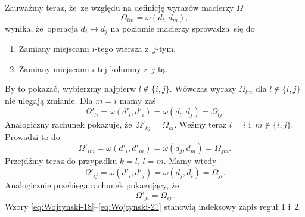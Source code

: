 \documentclass[a4paper,11pt]{article}
\begin{document}
Zauważmy teraz, że~ze względu na definicję wyrazów macierzy $\Omega$
\begin{equation}
  \label{eq:Wojtynski-17}
  \Omega_{ l m } = \omega( d_{ l }, d_{ m } ),
\end{equation}
wynika, że~operacja $d_{ i } \leftrightarrow d_{ j }$ na poziomie macierzy sprowadza~się do
\begin{enumerate}

\item Zamiany miejscami $i$-tego wiersza z~$j$-tym.

\item Zamiany miejscami $i$-tej kolumny z~$j$-tą.

\end{enumerate}
By to pokazać, wybierzmy najpierw $l \notin \{ i, j \}$. Wówczas wyrazy
$\Omega_{ l m }$ dla $l \notin \{ i, j \}$ nie ulegają zmianie. Dla $m = i$ mamy zaś
\begin{equation}
  \label{eq:Wojtynski-18}
  \Omega'_{ l i } = \omega( d'_{ l }, d'_{ i } ) = \omega( d_{ l }, d_{ j } ) =
  \Omega_{ l j }.
\end{equation}
Analogiczny rachunek pokazuje, że~$\Omega'_{ k j } = \Omega_{ k i }$. Weźmy teraz
$l = i$ i~$m \notin \{ i, j \}$. Prowadzi to do
\begin{equation}
  \label{eq:Wojtynski-19}
  \Omega'_{ i m } = \omega( d'_{ i }, d'_{ m } ) = \omega( d_{ j }, d_{ m } ) =
  \Omega_{ j m }.
\end{equation}
Przejdźmy teraz do przypadku $k = l$, $l = m$. Mamy wtedy
\begin{equation}
  \label{eq:Wojtynski-20}
  \Omega'_{ i j } = \omega( d'_{ i }, d'_{ j } ) = \omega( d_{ j }, d_{ i } ) =
  \Omega_{ j i }.
\end{equation}
Analogicznie przebiega rachunek pokazujący, że
\begin{equation}
  \label{eq:Wojtynski-21}
  \Omega'_{ j i } = \Omega_{ i j }.
\end{equation}
Wzory \eqref{eq:Wojtynski-18}--\eqref{eq:Wojtynski-21} stanowią indeksowy
zapis reguł 1 i~2.
\end{document}

